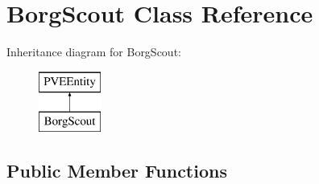 \hypertarget{classBorgScout}{
\section{BorgScout Class Reference}
\label{d5/d8c/classBorgScout}
}
Inheritance diagram for BorgScout:\begin{figure}[H]
\begin{center}
\leavevmode
\includegraphics[height=2cm]{d5/d8c/classBorgScout}
\end{center}
\end{figure}
\subsection*{Public Member Functions}
